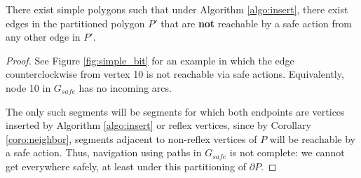 \documentclass[]{styles/svproc}  %
\begin{document}
\begin{proposition}
There exist simple polygons such that under Algorithm \ref{algo:insert}, there
exist edges in the partitioned polygon $P'$ that are \textbf{not} reachable by 
a safe action from any other edge in $P'$.
\end{proposition}

\begin{proof}
See Figure \ref{fig:simple_bit} for an example in which the edge
counterclockwise from vertex 10 is not reachable via safe actions. Equivalently,
node 10 in $G_{safe}$ has no incoming arcs.

The only such segments will be
segments for which both endpoints are vertices inserted by Algorithm
\ref{algo:insert} or reflex vertices, since by Corollary \ref{coro:neighbor},
segments adjacent to non-reflex vertices of $P$ will be reachable by a safe
action. Thus, navigation using paths in $G_{safe}$ is not complete: we cannot
get everywhere safely, at least under this partitioning of $\partial P$.
\end{proof}
\end{document}
